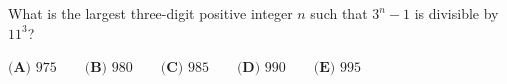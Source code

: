 What is the largest three-digit positive integer $n$ such that $3^{n}-1$ is divisible by $11^3$?

$\textbf{(A) } 975 \qquad\textbf{(B) } 980 \qquad\textbf{(C) } 985 \qquad\textbf{(D) } 990 \qquad\textbf{(E) } 995$
